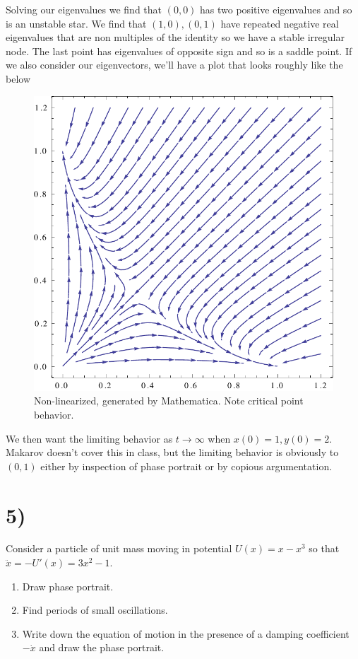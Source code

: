 \documentclass[10pt,twocolumn]{article}
\begin{document}
Solving our eigenvalues we find that $(0,0)$ has two positive eigenvalues and so is an unstable star. We find that $(1,0),(0,1)$ have repeated negative real eigenvalues that are non multiples of the identity so we have a stable irregular node. The last point has eigenvalues of opposite sign and so is a saddle point. If we also consider our eigenvectors, we'll have a plot that looks roughly like the below
\begin{figure}[!h]
    \centering
    \includegraphics[scale=0.3]{Ma2aFinal4Phase.pdf}
    \caption{Non-linearized, generated by Mathematica. Note critical point behavior.}
\end{figure}

We then want the limiting behavior as $t \to \infty$ when $x(0) = 1, y(0) = 2$. Makarov doesn't cover this in class, but the limiting behavior is obviously to $(0,1)$ either by inspection of phase portrait or by copious argumentation.

\section*{5)}

Consider a particle of unit mass moving in potential $U(x) = x-x^3$ so that $\ddot{x} = -U'(x) = 3x^2 - 1$.
\begin{enumerate}
    \item Draw phase portrait.
    \item Find periods of small oscillations.
    \item Write down the equation of motion in the presence of a damping coefficient $-\dot{x}$ and draw the phase portrait.
\end{enumerate}
\end{document}
